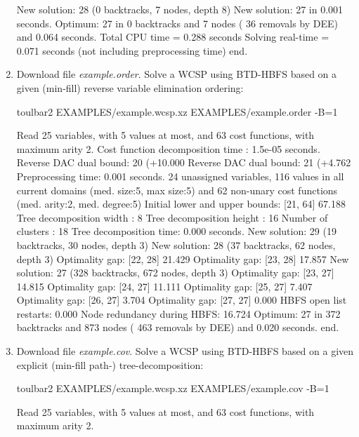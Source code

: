 \begin{enumerate}
{\begin{DoxyCode}
New solution: 28 (0 backtracks, 7 nodes, depth 8)
New solution: 27 in 0.001 seconds.
Optimum: 27 in 0 backtracks and 7 nodes ( 36 removals by DEE) and 0.064 seconds.
Total CPU time = 0.288 seconds
Solving real-time = 0.071 seconds (not including preprocessing time)
end.
\end{DoxyCode}}
\item Download file {\em example.order}. Solve a WCSP using BTD-HBFS based on a given (min-fill) reverse variable elimination ordering:
\begin{DoxyCode}
	toulbar2 EXAMPLES/example.wcsp.xz EXAMPLES/example.order -B=1
\end{DoxyCode}
{\scriptsize
\begin{DoxyCode}
Read 25 variables, with 5 values at most, and 63 cost functions, with maximum arity 2.
Cost function decomposition time : 1.5e-05 seconds.
Reverse DAC dual bound: 20 (+10.000%
Reverse DAC dual bound: 21 (+4.762%
Preprocessing time: 0.001 seconds.
24 unassigned variables, 116 values in all current domains (med. size:5, max size:5) and 62 non-unary cost functions (med. arity:2, med. degree:5)
Initial lower and upper bounds: [21, 64] 67.188%
Tree decomposition width  : 8
Tree decomposition height : 16
Number of clusters        : 18
Tree decomposition time: 0.000 seconds.
New solution: 29 (19 backtracks, 30 nodes, depth 3)
New solution: 28 (37 backtracks, 62 nodes, depth 3)
Optimality gap: [22, 28] 21.429 %
Optimality gap: [23, 28] 17.857 %
New solution: 27 (328 backtracks, 672 nodes, depth 3)
Optimality gap: [23, 27] 14.815 %
Optimality gap: [24, 27] 11.111 %
Optimality gap: [25, 27] 7.407 %
Optimality gap: [26, 27] 3.704 %
Optimality gap: [27, 27] 0.000 %
HBFS open list restarts: 0.000 %
Node redundancy during HBFS: 16.724 %
Optimum: 27 in 372 backtracks and 873 nodes ( 463 removals by DEE) and 0.020 seconds.
end.
\end{DoxyCode}}
\item Download file {\em example.cov}. Solve a WCSP using BTD-HBFS based on a given explicit (min-fill path-) tree-decomposition:
\begin{DoxyCode}
	toulbar2 EXAMPLES/example.wcsp.xz EXAMPLES/example.cov -B=1
\end{DoxyCode}
{\scriptsize
\begin{DoxyCode}
Read 25 variables, with 5 values at most, and 63 cost functions, with maximum arity 2.

\end{DoxyCode}}
\end{enumerate}

